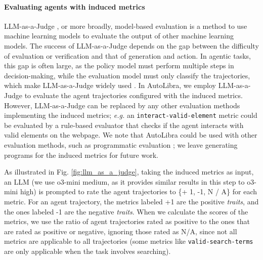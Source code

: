 \paragraph{Evaluating agents with induced metrics}
LLM-as-a-Judge \citep{zheng2023judging},
or more broadly, model-based evaluation
\citep{zhang2019bertscore,celikyilmaz2021evaluationtextgenerationsurvey}
is a method to use machine learning models to evaluate the output of other machine learning models.
The success of LLM-as-a-Judge depends on the gap between the difficulty of evaluation or verification and
that of generation and action. 
In agentic tasks, this gap is often large, as the policy model must perform multiple steps in decision-making, while the evaluation model must only
classify the trajectories, which make LLM-as-a-Judge widely used \citep{zhouwebarena,he2024webvoyager,zhousotopia}.
In AutoLibra, we employ LLM-as-a-Judge to
evaluate the agent trajectories configured with the induced metrics. However, LLM-as-a-Judge
can be replaced by any other evaluation methods implementing the induced metrics;
\emph{e.g.} an \texttt{interact-valid-element} metric
could be evaluated by a rule-based evaluator that checks if the agent
interacts with valid elements on the webpage. We note that AutoLibra could be used with other evaluation methods, such as
programmatic evaluation \citep{maeureka}; we leave generating programs for the induced metrics for future work.

As illustrated in Fig. \ref{fig:llm_as_a_judge}, taking the induced metrics as input, an LLM (we use o3-mini medium,
as it provides similar results in this step to o3-mini high) is prompted to rate the agent trajectories to \{+ 1, -1, N / A\} for each metric. For an agent trajectory, the metrics labeled +1 are
the positive \emph{traits}, and the ones labeled -1 are the negative \emph{traits}. When we calculate the scores of
the metrics, we use the ratio of agent trajectories rated as positive
to the ones that are rated as positive or negative, ignoring those rated as N/A,
since not all metrics are applicable to all trajectories
(some metrics like \texttt{valid-search-terms} are only applicable when the task
involves searching). 

